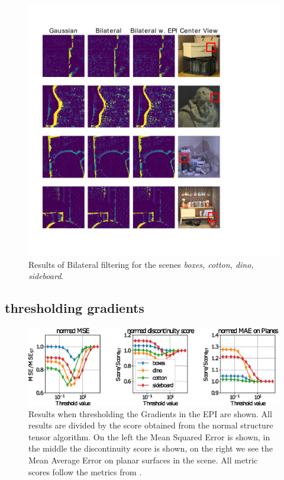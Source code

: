 \documentclass  [
  paper    = a4,
  BCOR     = 10mm,
  twoside,
  fontsize = 12pt,
  fleqn,
  toc      = bibnumbered,
  toc      = listofnumbered,
  numbers  = noendperiod,
  headings = normal,
  listof   = leveldown,
  version  = 3.03
]                                       {scrreprt}
\begin{document}
\begin{figure}
	\centering
	\includegraphics[width=1\linewidth]{images/bilat_results}
	\caption[Results of the bilateral filtering]{Results of Bilateral filtering for the scenes \textit{ boxes, cotton, dino, sideboard}.}
	\label{fig:bilatresults}
\end{figure}




\subsection{thresholding gradients}
\begin{figure}
	\centering
	\includegraphics[width=1\linewidth]{images/thresh_params}
	\caption[Results when thresholding the Gradients in the EPI]{Results when thresholding the Gradients in the EPI are shown. All results are divided by the score obtained from the normal structure tensor algorithm. On the left the Mean Squared Error is shown, in the middle the discontinuity score is shown, on the right we see the Mean Average Error on planar surfaces in the scene. All metric scores follow the metrics from \cite{honauer2016benchmark}. }
	\label{fig:threshparams}
\end{figure}
\end{document}
